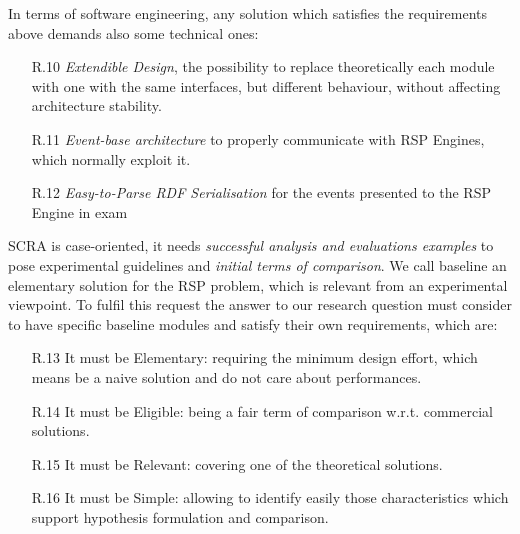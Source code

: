 In terms of software engineering, any solution which satisfies the requirements above demands also some technical ones: 
\begin{enumerate}
\item[R.10] \textit{Extendible Design}, the possibility to replace theoretically each module with one with the same interfaces, but different behaviour, without affecting architecture stability.
\item[R.11] \textit{Event-base architecture} to properly communicate with  RSP Engines, which normally exploit it.
\item[R.12] \textit{Easy-to-Parse RDF Serialisation} for the events presented to the RSP Engine in exam
\end{enumerate}

SCRA is case-oriented, it needs \textit{successful analysis and evaluations examples} to pose experimental guidelines and \textit{initial terms of comparison}. We call baseline an elementary solution for the RSP problem, which is relevant from an experimental viewpoint. To fulfil this request the answer to our research question must consider to have specific baseline modules and satisfy their own requirements, which are: \begin{enumerate}
\item[R.13] It must be Elementary: requiring the minimum design effort, which means be a naive solution and do not care about performances.  %
\item[R.14] It must be Eligible: being a fair term of comparison w.r.t. commercial solutions. %
\item[R.15] It must be Relevant: covering one of the theoretical solutions. %
\item[R.16] It must be Simple: allowing to identify easily those characteristics which support hypothesis formulation and comparison.  %
\end{enumerate}


